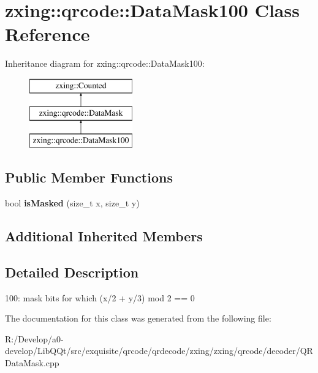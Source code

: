 \hypertarget{classzxing_1_1qrcode_1_1_data_mask100}{}\section{zxing\+:\+:qrcode\+:\+:Data\+Mask100 Class Reference}
\label{classzxing_1_1qrcode_1_1_data_mask100}
Inheritance diagram for zxing\+:\+:qrcode\+:\+:Data\+Mask100\+:\begin{figure}[H]
\begin{center}
\leavevmode
\includegraphics[height=3.000000cm]{classzxing_1_1qrcode_1_1_data_mask100}
\end{center}
\end{figure}
\subsection*{Public Member Functions}
\begin{DoxyCompactItemize}
\item 
\mbox{\label{classzxing_1_1qrcode_1_1_data_mask100_a2462af052ff84c9e222e002491e0be60}} 
bool {\bfseries is\+Masked} (size\+\_\+t x, size\+\_\+t y)
\end{DoxyCompactItemize}
\subsection*{Additional Inherited Members}


\subsection{Detailed Description}
100\+: mask bits for which (x/2 + y/3) mod 2 == 0 

The documentation for this class was generated from the following file\+:\begin{DoxyCompactItemize}
\item 
R\+:/\+Develop/a0-\/develop/\+Lib\+Q\+Qt/src/exquisite/qrcode/qrdecode/zxing/zxing/qrcode/decoder/Q\+R\+Data\+Mask.\+cpp\end{DoxyCompactItemize}
